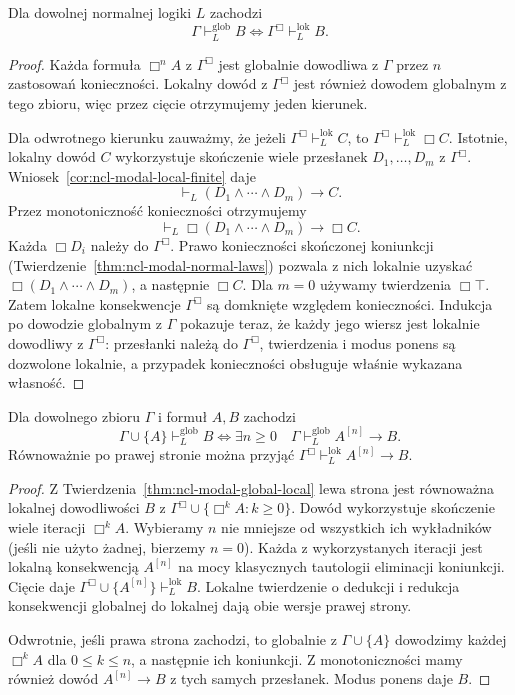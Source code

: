 \begin{twierdzenie}
\label{thm:ncl-modal-global-local}
Dla dowolnej normalnej logiki $L$ zachodzi
\[
 \Gamma\vdash_L^{\mathrm{glob}} B
 \iff
 \Gamma^\Box\vdash_L^{\mathrm{lok}} B.
\]
\end{twierdzenie}
\begin{proof}
Każda formuła $\Box^n A$ z $\Gamma^\Box$
jest globalnie dowodliwa z $\Gamma$ przez
$n$ zastosowań konieczności.
Lokalny dowód z $\Gamma^\Box$ jest również
dowodem globalnym z tego zbioru, więc przez
cięcie otrzymujemy jeden kierunek.

Dla odwrotnego kierunku zauważmy, że jeżeli
$\Gamma^\Box\vdash_L^{\mathrm{lok}} C$, to
$\Gamma^\Box\vdash_L^{\mathrm{lok}}\Box C$.
Istotnie, lokalny dowód $C$ wykorzystuje
skończenie wiele przesłanek $D_1,\ldots,D_m$
z $\Gamma^\Box$. Wniosek~\ref{cor:ncl-modal-local-finite}
daje
\[
 \vdash_L(D_1\wedge\cdots\wedge D_m)\to C.
\]
Przez monotoniczność konieczności otrzymujemy
\[
 \vdash_L\Box(D_1\wedge\cdots\wedge D_m)\to\Box C.
\]
Każda $\Box D_i$ należy do $\Gamma^\Box$.
Prawo konieczności skończonej koniunkcji
(Twierdzenie~\ref{thm:ncl-modal-normal-laws})
pozwala z nich lokalnie uzyskać
$\Box(D_1\wedge\cdots\wedge D_m)$, a następnie
$\Box C$. Dla $m=0$ używamy twierdzenia
$\Box\top$.
Zatem lokalne konsekwencje $\Gamma^\Box$
są domknięte względem konieczności.
Indukcja po dowodzie globalnym z $\Gamma$
pokazuje teraz, że każdy jego wiersz jest
lokalnie dowodliwy z $\Gamma^\Box$:
przesłanki należą do $\Gamma^\Box$, twierdzenia
i modus ponens są dozwolone lokalnie, a przypadek
konieczności obsługuje właśnie wykazana własność.
\end{proof}

\begin{twierdzenie}
\label{thm:ncl-modal-global-deduction}
Dla dowolnego zbioru $\Gamma$ i formuł $A,B$
zachodzi
\[
 \Gamma\cup\{A\}\vdash_L^{\mathrm{glob}} B
 \iff
 \exists n\geq0\quad
 \Gamma\vdash_L^{\mathrm{glob}} A^{[n]}\to B.
\]
Równoważnie po prawej stronie można przyjąć
$\Gamma^\Box\vdash_L^{\mathrm{lok}} A^{[n]}\to B$.
\end{twierdzenie}
\begin{proof}
Z Twierdzenia~\ref{thm:ncl-modal-global-local}
lewa strona jest równoważna lokalnej dowodliwości
$B$ z $\Gamma^\Box\cup\{\Box^k A:k\geq0\}$.
Dowód wykorzystuje skończenie wiele iteracji
$\Box^k A$. Wybieramy $n$ nie mniejsze od
wszystkich ich wykładników (jeśli nie użyto
żadnej, bierzemy $n=0$).
Każda z wykorzystanych iteracji jest lokalną
konsekwencją $A^{[n]}$ na mocy klasycznych
tautologii eliminacji koniunkcji.
Cięcie daje
$\Gamma^\Box\cup\{A^{[n]}\}\vdash_L^{\mathrm{lok}}B$.
Lokalne twierdzenie o dedukcji i redukcja
konsekwencji globalnej do lokalnej dają
obie wersje prawej strony.

Odwrotnie, jeśli prawa strona zachodzi, to
globalnie z $\Gamma\cup\{A\}$ dowodzimy
każdej $\Box^k A$ dla $0\leq k\leq n$,
a następnie ich koniunkcji. Z monotoniczności
mamy również dowód $A^{[n]}\to B$ z tych
samych przesłanek. Modus ponens daje $B$.
\end{proof}


